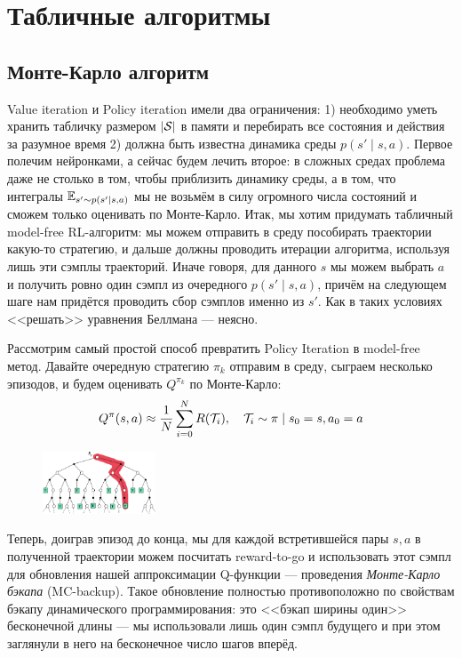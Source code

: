 \section{Табличные алгоритмы}\label{tabularrlsection}

\subsection{Монте-Карло алгоритм}

Value iteration и Policy iteration имели два ограничения: 1) необходимо уметь хранить табличку размером $| \mathcal{S} |$ в памяти и перебирать все состояния и действия за разумное время 2) должна быть известна динамика среды $p(s' \mid s, a)$. Первое полечим нейронками, а сейчас будем лечить второе: в сложных средах проблема даже не столько в том, чтобы приблизить динамику среды, а в том, что интегралы $\mathbb{E}_{s' \sim p(s' \mid s, a)}$ мы не возьмём в силу огромного числа состояний и сможем только оценивать по Монте-Карло. 
Итак, мы хотим придумать табличный model-free RL-алгоритм: мы можем отправить в среду пособирать траектории какую-то стратегию, и дальше должны проводить итерации алгоритма, используя лишь эти сэмплы траекторий. Иначе говоря, для данного $s$ мы можем выбрать $a$ и получить ровно один сэмпл из очередного $p(s' \mid s, a)$, причём на следующем шаге нам придётся проводить сбор сэмплов именно из $s'$. Как в таких условиях <<решать>> уравнения Беллмана --- неясно.

Рассмотрим самый простой способ превратить Policy Iteration в model-free метод. Давайте очередную стратегию $\pi_k$ отправим в среду, сыграем несколько эпизодов, и будем оценивать $Q^{\pi_k}$ по Монте-Карло:
$$Q^{\pi}(s, a) \approx \frac{1}{N} \sum_{i=0}^N R(\mathcal{T}_i), \quad \mathcal{T}_i \sim \pi \mid s_0 = s, a_0 = a$$

\begin{figure}
\centering
\includegraphics[width=0.3\textwidth]{Images/MC_backup.png}
\end{figure}
Теперь, доиграв эпизод до конца, мы для каждой встретившейся пары $s, a$ в полученной траектории можем посчитать reward-to-go и использовать этот сэмпл для обновления нашей аппроксимации Q-функции --- проведения \emph{Монте-Карло бэкапа} (MC-backup). Такое обновление полностью противоположно по свойствам бэкапу динамического программирования: это <<бэкап ширины один>> бесконечной длины --- мы использовали лишь один сэмпл будущего и при этом заглянули в него на бесконечное число шагов вперёд.


